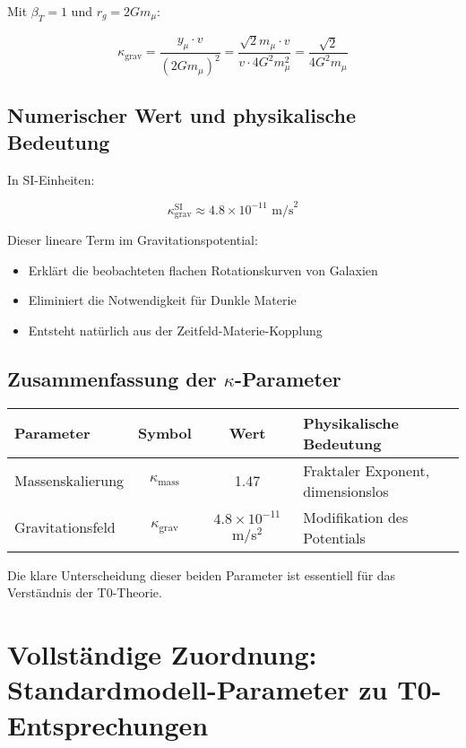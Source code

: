 \documentclass[12pt,a4paper]{article}
\theoremstyle{definition}
\begin{document}
	Mit $\beta_T = 1$ und $r_g = 2Gm_\mu$:
	
	\begin{equation}
		\kappa_{\text{grav}} = \frac{y_\mu \cdot v}{(2Gm_\mu)^2} = \frac{\sqrt{2} m_\mu \cdot v}{v \cdot 4G^2m_\mu^2} = \frac{\sqrt{2}}{4G^2m_\mu}
	\end{equation}
	
	\subsection{Numerischer Wert und physikalische Bedeutung}
	
	In SI-Einheiten:
	
	\begin{equation}
		\kappa_{\text{grav}}^{\text{SI}} \approx 4.8 \times 10^{-11} \text{ m/s}^2
	\end{equation}
	
	Dieser lineare Term im Gravitationspotential:
	\begin{itemize}
		\item Erkl\"art die beobachteten flachen Rotationskurven von Galaxien
		\item Eliminiert die Notwendigkeit f\"ur Dunkle Materie
		\item Entsteht nat\"urlich aus der Zeitfeld-Materie-Kopplung
	\end{itemize}
	
	\subsection{Zusammenfassung der $\kappa$-Parameter}
	
	\begin{center}
		\begin{tabular}{|l|c|c|l|}
			\hline
			\textbf{Parameter} & \textbf{Symbol} & \textbf{Wert} & \textbf{Physikalische Bedeutung} \\
			\hline
			Massenskalierung & $\kappa_{\text{mass}}$ & 1.47 & Fraktaler Exponent, dimensionslos \\
			Gravitationsfeld & $\kappa_{\text{grav}}$ & $4.8 \times 10^{-11}$ m/s$^2$ & Modifikation des Potentials \\
			\hline
		\end{tabular}
	\end{center}
	
	Die klare Unterscheidung dieser beiden Parameter ist essentiell f\"ur das Verst\"andnis der T0-Theorie.
\section{Vollständige Zuordnung: Standardmodell-Parameter zu T0-Entsprechungen}
\label{sec:sm_t0_mapping}
\end{document}
